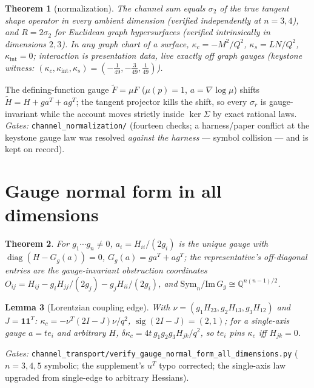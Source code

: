 \documentclass[11pt]{article}
\newtheorem{theorem}{Theorem}
\newtheorem{lemma}[theorem]{Lemma}
\theoremstyle{definition}
\newcommand{\kc}{\kappa_c}
\newcommand{\ki}{\kappa_{\mathrm{int}}}
\newcommand{\ks}{\kappa_s}
\begin{document}
\begin{theorem}[normalization]\label{thm:B}
The channel sum equals $\sigma_2$ of the true tangent shape operator in every
ambient dimension (verified independently at $n=3,4$), and $R=2\sigma_2$ for
Euclidean graph hypersurfaces (verified intrinsically in dimensions $2,3$). In any
graph chart of a surface, $\kc=-M^2/Q^2$, $\ks=LN/Q^2$, $\ki=0$; interaction is
presentation data, live exactly off graph gauges (keystone witness:
$(\kc,\ki,\ks)=(-\tfrac1{49},-\tfrac3{49},\tfrac1{49})$).
\end{theorem}

The defining-function gauge $\widetilde F=\mu F$ ($\mu(p)=1$,
$a=\nabla\log\mu$) shifts $\widetilde H=H+ga^T+ag^T$; the tangent projector kills
the shift, so every $\sigma_r$ is gauge-invariant while the account moves strictly
inside $\ker\Sigma$ by exact rational laws. \emph{Gates:}
\texttt{channel\_normalization/} (fourteen checks; a harness/paper conflict at the
keystone gauge law was resolved \emph{against the harness} --- symbol collision ---
and is kept on record).

\section{Gauge normal form in all dimensions}
\begin{theorem}\label{thm:gnf}
For $g_1\cdots g_n\neq0$, $a_i=H_{ii}/(2g_i)$ is the unique gauge with
$\operatorname{diag}(H-G_g(a))=0$, $G_g(a)=ga^T+ag^T$; the representative's
off-diagonal entries are the gauge-invariant obstruction coordinates
$O_{ij}=H_{ij}-g_iH_{jj}/(2g_j)-g_jH_{ii}/(2g_i)$, and
$\mathrm{Sym}_n/\mathrm{Im}\,G_g\cong\mathbb{Q}^{n(n-1)/2}$.
\end{theorem}

\begin{lemma}[Lorentzian coupling edge]
With $\nu=(g_1H_{23},g_2H_{13},g_3H_{12})$ and $J=\mathbf 1\mathbf 1^T$:
$\kc=-\nu^T(2I-J)\nu/q^2$, $\operatorname{sig}(2I-J)=(2,1)$; for a single-axis
gauge $a=te_i$ and \emph{arbitrary} $H$,
$\delta\kc=4t\,g_1g_2g_3H_{jk}/q^2$, so $te_i$ pins $\kc$ iff $H_{jk}=0$.
\end{lemma}

\emph{Gates:} \texttt{channel\_transport/verify\_gauge\_normal\_form\_all\_dimensions.py}
($n=3,4,5$ symbolic; the supplement's $u^T$ typo corrected; the single-axis law
upgraded from single-edge to arbitrary Hessians).
\end{document}
